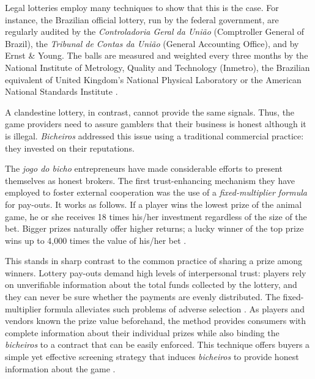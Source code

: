 \documentclass[a4paper,12pt]{article}
\begin{document}
Legal lotteries employ many techniques to show that this is the case. For instance, the Brazilian official lottery, run by the federal government, are regularly audited by the \textit{Controladoria Geral da União} (Comptroller General of Brazil), the \textit{Tribunal de Contas da União} (General Accounting Office), and by Ernst \& Young. The balls are measured and weighted every three months by the National Institute of Metrology, Quality and Technology (Inmetro), the Brazilian equivalent of United Kingdom's National Physical Laboratory or the American National Standards Institute \citep{uol2016loteria}. 

A clandestine lottery, in contrast, cannot provide the same signals. Thus, the game providers need to assure gamblers that their business is honest although it is illegal. \textit{Bicheiros} addressed this issue using a traditional commercial practice: they invested on their reputations.   

The \textit{jogo do bicho} entrepreneurs have made considerable efforts to present themselves as honest brokers. The first trust-enhancing mechanism they have employed to foster external cooperation was the use of a \textit{fixed-multiplier formula} for pay-outs. It works as follows. If a player wins the lowest prize of the animal game, he or she receives 18 times his/her investment regardless of the size of the bet. Bigger prizes naturally offer higher returns; a lucky winner of the top prize wins up to 4,000 times the value of his/her bet \citetext{\citealp[89]{labronici2012paratodos}; \citealp[20]{magalhaes2005ganhou}}.

This stands in sharp contrast to the common practice of sharing a prize among winners. Lottery pay-outs demand high levels of interpersonal trust: players rely on unverifiable information about the total funds collected by the lottery, and they can never be sure whether the payments are evenly distributed. The fixed-multiplier formula alleviates such problems of adverse selection \citep{akerlof1970market, cohen2010testing, levin2001information}. As players and vendors known the prize value beforehand, the method provides consumers with complete information about their individual prizes while also binding the \textit{bicheiros} to a contract that can be easily enforced. This technique offers buyers a simple yet effective screening strategy that induces \textit{bicheiros} to provide honest information about the game \citep{spence1973job, stiglitz1981credit}.
\end{document}
